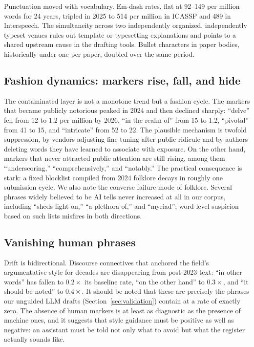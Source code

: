 \documentclass[a4paper,10pt,twocolumn]{article}
\begin{document}
Punctuation moved with vocabulary. Em-dash rates, flat at 92--149 per million words for 24 years, tripled in 2025 to 514 per million in ICASSP and 489 in Interspeech. The simultaneity across two independently organized, independently typeset venues rules out template or typesetting explanations and points to a shared upstream cause in the drafting tools. Bullet characters in paper bodies, historically under one per paper, doubled over the same period.

\subsection{Fashion dynamics: markers rise, fall, and hide}

The contaminated layer is not a monotone trend but a fashion cycle. The markers that became publicly notorious peaked in 2024 and then declined sharply: ``delve'' fell from 12 to 1.2 per million by 2026, ``in the realm of'' from 15 to 1.2, ``pivotal'' from 41 to 15, and ``intricate'' from 52 to 22. The plausible mechanism is twofold suppression, by vendors adjusting fine-tuning after public ridicule \cite{juzek2025} and by authors deleting words they have learned to associate with exposure. On the other hand, markers that never attracted public attention are still rising, among them ``underscoring,'' ``comprehensively,'' and ``notably.'' The practical consequence is stark: a fixed blocklist compiled from 2024 folklore decays in roughly one submission cycle. We also note the converse failure mode of folklore. Several phrases widely believed to be AI tells never increased at all in our corpus, including ``sheds light on,'' ``a plethora of,'' and ``myriad''; word-level suspicion based on such lists misfires in both directions.

\subsection{Vanishing human phrases}

Drift is bidirectional. Discourse connectives that anchored the field's argumentative style for decades are disappearing from post-2023 text: ``in other words'' has fallen to $0.2\times$ its baseline rate, ``on the other hand'' to $0.3\times$, and ``it should be noted'' to $0.4\times$. It should be noted that these are precisely the phrases our unguided LLM drafts (Section~\ref{sec:validation}) contain at a rate of exactly zero. The absence of human markers is at least as diagnostic as the presence of machine ones, and it suggests that style guidance must be positive as well as negative: an assistant must be told not only what to avoid but what the register actually sounds like.
\end{document}
